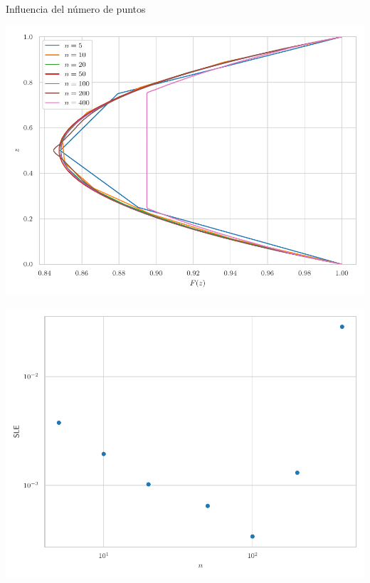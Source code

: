 \documentclass[11pt]{beamer}
\begin{document}
            \begin{frame}{Influencia del número de puntos}
			\justifying
			\begin{minipage}[b]{0.48\textwidth}
                    \centering
                    \includegraphics[height=0.5 \textheight]{Figuras/sol_n.pdf}
                \end{minipage}
                \hfill
                \begin{minipage}[b]{0.48\textwidth}
                    \centering
                    \includegraphics[height=0.5 \textheight]{Figuras/error_n.pdf}
                \end{minipage}
		\end{frame}
\end{document}
